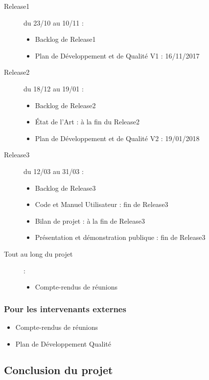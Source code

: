 \documentclass[10pt,a4paper]{article}
\begin{document}
\begin{description}

\item [Release1] du 23/10 au 10/11 : 
\begin{itemize}
\item Backlog de Release1
\item Plan de Développement et de Qualité V1 : 16/11/2017
\end{itemize}

\item [Release2] du 18/12 au 19/01  : 
\begin{itemize}
\item Backlog de Release2
\item État de l'Art : à la fin du Release2
\item Plan de Développement et de Qualité V2 : 19/01/2018
\end{itemize}

\item [Release3] du 12/03 au 31/03  : 
\begin{itemize}
\item Backlog de Release3
\item Code et Manuel Utilisateur : fin de Release3
\item Bilan de projet : à la fin de Release3
\item Présentation et démonstration publique : fin de Release3
\end{itemize}

\item [Tout au long du projet] : 
\begin{itemize}
\item Compte-rendus de réunions 
\end{itemize}
\end{description}

\subsubsection{Pour les intervenants externes}
\begin{itemize}
\item Compte-rendus de réunions 
\item Plan de Développement Qualité
\end{itemize}


\subsection{Conclusion du projet}
\end{document}
